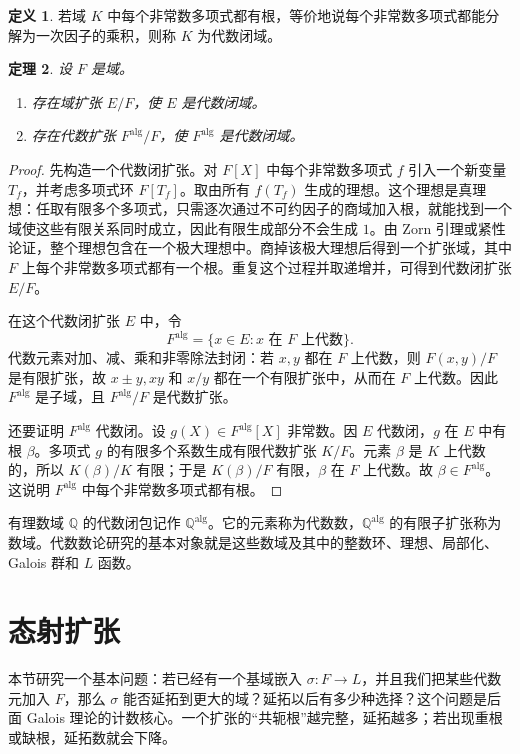 \documentclass[11pt,a4paper,openany]{ctexbook}
\numberwithin{equation}{chapter}
\newcommand{\Q}{\mathbb{Q}}
\theoremstyle{plain}
\newtheorem{theorem}{定理}[chapter]
\theoremstyle{definition}
\newtheorem{definition}[theorem]{定义}
\theoremstyle{remark}
\begin{document}
\begin{definition}
若域 $K$ 中每个非常数多项式都有根，等价地说每个非常数多项式都能分解为一次因子的乘积，则称 $K$ 为代数闭域。
\end{definition}

\begin{theorem}
设 $F$ 是域。
\begin{enumerate}[label=(\arabic*)]
\item 存在域扩张 $E/F$，使 $E$ 是代数闭域。
\item 存在代数扩张 $F^{\mathrm{alg}}/F$，使 $F^{\mathrm{alg}}$ 是代数闭域。
\end{enumerate}
\end{theorem}

\begin{proof}
先构造一个代数闭扩张。对 $F[X]$ 中每个非常数多项式 $f$ 引入一个新变量 $T_f$，并考虑多项式环 $F[T_f]$。取由所有 $f(T_f)$ 生成的理想。这个理想是真理想：任取有限多个多项式，只需逐次通过不可约因子的商域加入根，就能找到一个域使这些有限关系同时成立，因此有限生成部分不会生成 $1$。由 Zorn 引理或紧性论证，整个理想包含在一个极大理想中。商掉该极大理想后得到一个扩张域，其中 $F$ 上每个非常数多项式都有一个根。重复这个过程并取递增并，可得到代数闭扩张 $E/F$。

在这个代数闭扩张 $E$ 中，令
\[
F^{\mathrm{alg}}=\{x\in E:x\text{ 在 }F\text{ 上代数}\}.
\]
代数元素对加、减、乘和非零除法封闭：若 $x,y$ 都在 $F$ 上代数，则 $F(x,y)/F$ 是有限扩张，故 $x\pm y,xy$ 和 $x/y$ 都在一个有限扩张中，从而在 $F$ 上代数。因此 $F^{\mathrm{alg}}$ 是子域，且 $F^{\mathrm{alg}}/F$ 是代数扩张。

还要证明 $F^{\mathrm{alg}}$ 代数闭。设 $g(X)\in F^{\mathrm{alg}}[X]$ 非常数。因 $E$ 代数闭，$g$ 在 $E$ 中有根 $\beta$。多项式 $g$ 的有限多个系数生成有限代数扩张 $K/F$。元素 $\beta$ 是 $K$ 上代数的，所以 $K(\beta)/K$ 有限；于是 $K(\beta)/F$ 有限，$\beta$ 在 $F$ 上代数。故 $\beta\in F^{\mathrm{alg}}$。这说明 $F^{\mathrm{alg}}$ 中每个非常数多项式都有根。
\end{proof}

有理数域 $\Q$ 的代数闭包记作 $\Q^{\mathrm{alg}}$。它的元素称为代数数，$\Q^{\mathrm{alg}}$ 的有限子扩张称为数域。代数数论研究的基本对象就是这些数域及其中的整数环、理想、局部化、Galois 群和 $L$ 函数。

\section{态射扩张}

本节研究一个基本问题：若已经有一个基域嵌入 $\sigma:F\to L$，并且我们把某些代数元加入 $F$，那么 $\sigma$ 能否延拓到更大的域？延拓以后有多少种选择？这个问题是后面 Galois 理论的计数核心。一个扩张的“共轭根”越完整，延拓越多；若出现重根或缺根，延拓数就会下降。
\end{document}

